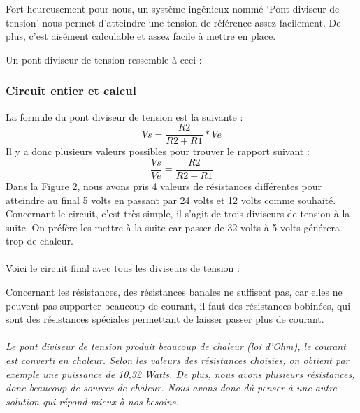 \documentclass{PackagerQualityN}
\begin{document}
Fort heureusement pour nous, un système ingénieux nommé ‘Pont diviseur de tension’ nous permet d’atteindre une tension de référence assez facilement. De plus, c'est aisément calculable et assez facile à mettre en place.

Un pont diviseur de tension ressemble à ceci :


\subsubsection{Circuit entier et calcul}

La formule du pont diviseur de tension est la suivante : \[Vs=\frac{R2}{R2+R1}*Ve\]
Il y a donc plusieurs valeurs possibles pour trouver le rapport suivant : \[\frac{Vs}{Ve}=\frac{R2}{R2+R1}\]
Dans la Figure 2, nous avons pris 4 valeurs de résistances différentes pour atteindre au final 5 volts en passant par 24 volts et 12 volts comme souhaité.
Concernant le circuit, c'est très simple, il s'agit de trois diviseurs de tension à la suite. On préfère les mettre à la suite car passer de 32 volts à 5 volts générera trop de chaleur.
\\\\
Voici le circuit final avec tous les diviseurs de tension :



\newp
Concernant les résistances, des résistances banales ne suffisent pas, car elles ne peuvent pas supporter beaucoup de courant, il faut des résistances bobinées, qui sont des résistances spéciales permettant de laisser passer plus de courant.




\paragraph{}
\textit{Le pont diviseur de tension produit beaucoup de chaleur (loi d'Ohm), le courant est converti en chaleur. Selon les valeurs des résistances choisies, on obtient par exemple une puissance de 10,32 Watts.
De plus, nous  avons plusieurs résistances, donc beaucoup de sources de chaleur.
Nous avons donc dû penser à une autre solution qui répond mieux à nos besoins.}
\end{document}
